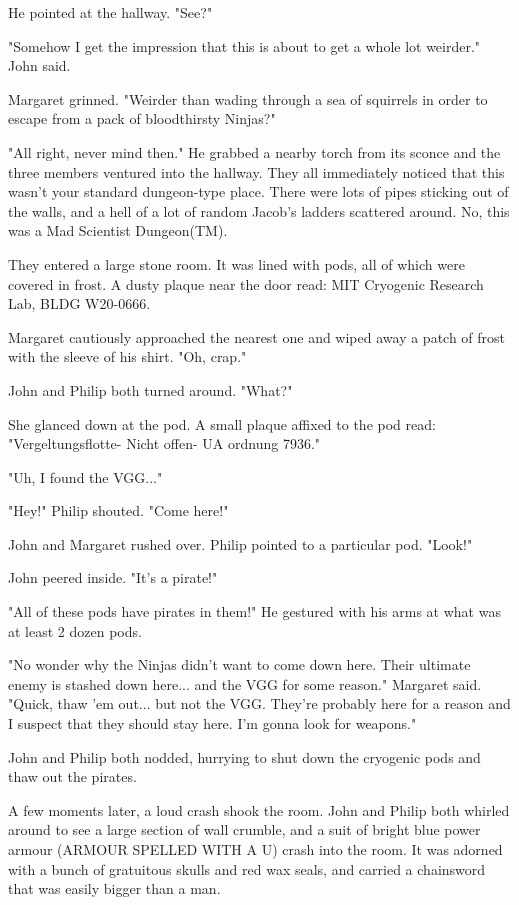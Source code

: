 \documentclass[10pt]{article}
\begin{document}
He pointed at the hallway. "See?"

"Somehow I get the impression that this is about to get a whole lot weirder." John said.

Margaret grinned. "Weirder than wading through a sea of squirrels in order to escape from a pack of bloodthirsty Ninjas?"

"All right, never mind then." He grabbed a nearby torch from its sconce and the three members ventured into the hallway. They all immediately noticed that this wasn't your standard dungeon-type place. There were lots of pipes sticking out of the walls, and a hell of a lot of random Jacob's ladders scattered around. No, this was a Mad Scientist Dungeon(TM).

They entered a large stone room. It was lined with pods, all of which were covered in frost. A dusty plaque near the door read: MIT Cryogenic Research Lab, BLDG W20-0666.

Margaret cautiously approached the nearest one and wiped away a patch of frost with the sleeve of his shirt. "Oh, crap."

John and Philip both turned around. "What?"

She glanced down at the pod. A small plaque affixed to the pod read: "Vergeltungsflotte- Nicht offen- UA ordnung 7936."

"Uh, I found the VGG..."

"Hey!" Philip shouted. "Come here!"

John and Margaret rushed over. Philip pointed to a particular pod. "Look!"

John peered inside. "It's a pirate!"

"All of these pods have pirates in them!" He gestured with his arms at what was at least 2 dozen pods.

"No wonder why the Ninjas didn't want to come down here. Their ultimate enemy is stashed down here... and the VGG for some reason." Margaret said. "Quick, thaw 'em out... but not the VGG. They're probably here for a reason and I suspect that they should stay here. I'm gonna look for weapons."

John and Philip both nodded, hurrying to shut down the cryogenic pods and thaw out the pirates.

A few moments later, a loud crash shook the room. John and Philip both whirled around to see a large section of wall crumble, and a suit of bright blue power armour (ARMOUR SPELLED WITH A U) crash into the room. It was adorned with a bunch of gratuitous skulls and red wax seals, and carried a chainsword that was easily bigger than a man.
\end{document}
